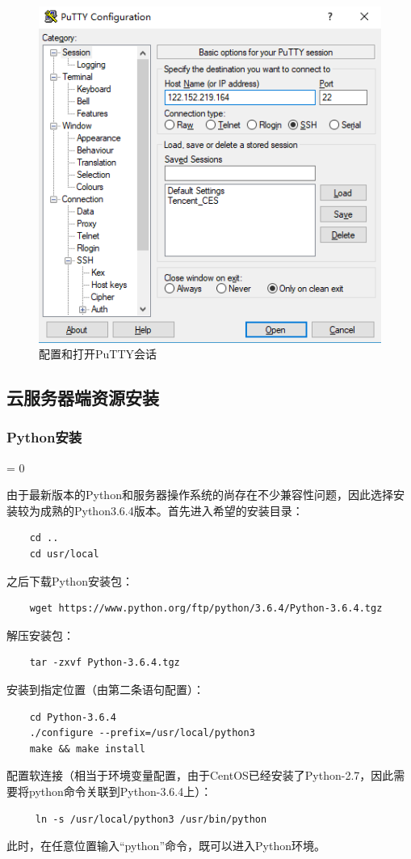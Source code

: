 \documentclass[a4paper,11pt]{ctexart}
\newcommand{\subsubpar}
{
	\par
	\hangafter = 0
	\setlength{\hangindent}{2em}
}
\begin{document}
\begin{spacing}{1.5}
\begin{figure}[h]
	\includegraphics[scale=0.3]{PUTTY4.png}
	\caption{配置和打开PuTTY会话}\label{figure:PUTTY234}
\end{figure}
\subsection{云服务器端资源安装}
\subsubsection{Python安装}
\subsubpar
由于最新版本的Python和服务器操作系统的尚存在不少兼容性问题，因此选择安装较为成熟的Python3.6.4版本。首先进入希望的安装目录：
\begin{verbatim}
    cd ..
    cd usr/local
\end{verbatim}
之后下载Python安装包：
\begin{verbatim}
    wget https://www.python.org/ftp/python/3.6.4/Python-3.6.4.tgz
\end{verbatim}
解压安装包：
\begin{verbatim}
    tar -zxvf Python-3.6.4.tgz
\end{verbatim}
安装到指定位置（由第二条语句配置）：
\begin{verbatim}
    cd Python-3.6.4
    ./configure --prefix=/usr/local/python3
    make && make install
\end{verbatim}
配置软连接（相当于环境变量配置，由于CentOS已经安装了Python-2.7，因此需要将python命令关联到Python-3.6.4上）：
\begin{verbatim}
     ln -s /usr/local/python3 /usr/bin/python
\end{verbatim}
此时，在任意位置输入“python”命令，既可以进入Python环境。

\end{spacing}
\end{document}

